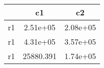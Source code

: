 \begin{table}[htbp]
\begin{tabular}{lcc} \hline \hline
 & c1  & c2  \\  \hline 
r1 &  2.51e+05 &  2.08e+05 \\  
r1 &  4.31e+05 &  3.57e+05 \\  
r1 & 25880.391 &  1.74e+05 \\  
\hline \hline \end{tabular}
\end{table}
